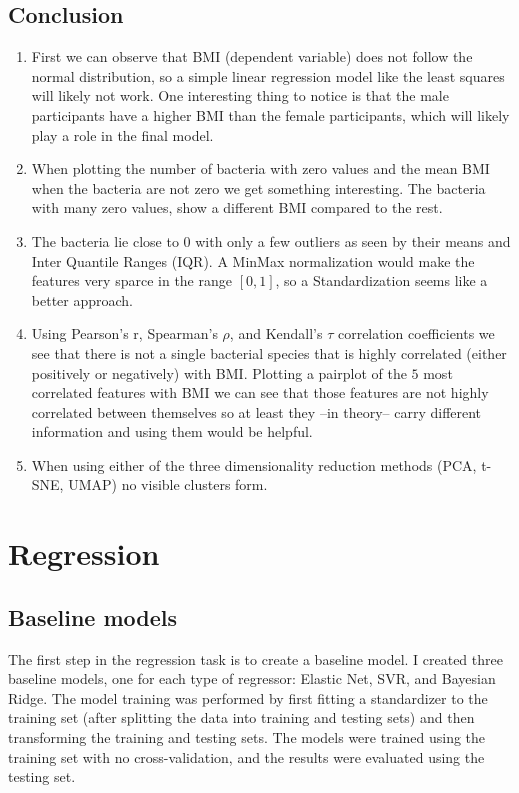 \documentclass[12pt]{article}
\begin{document}
\subsection{Conclusion}
\begin{enumerate}
    \item First we can observe that BMI (dependent variable) does not follow the
    normal distribution, so a simple linear regression model like the least squares
    will likely not work. One interesting thing to notice is that the male
    participants have a higher BMI than the female participants, which will likely
    play a role in the final model.
    \item When plotting the number of bacteria with zero values and the mean BMI
    when the bacteria are not zero we get something interesting. The bacteria with
    many zero values, show a different BMI compared to the rest.
    \item The bacteria lie close to $0$ with only a few outliers as seen by their
    means and Inter Quantile Ranges (IQR). A MinMax normalization would make the
    features very sparce in the range $[0, 1]$, so a Standardization seems like a
    better approach.
    \item Using Pearson's r, Spearman's $\rho$, and Kendall's $\tau$ correlation
    coefficients we see that there is not a single bacterial species that is highly
    correlated (either positively or negatively) with BMI. Plotting a pairplot of
    the $5$ most correlated features with BMI we can see that those features are
    not highly correlated between themselves so at least they --in theory-- carry
    different information and using them would be helpful.
    \item When using either of the three dimensionality reduction methods (PCA,
    t-SNE, UMAP) no visible clusters form.
\end{enumerate}


\section{Regression}
\subsection{Baseline models}

The first step in the regression task is to create a baseline model. I created three
baseline models, one for each type of regressor: Elastic Net, SVR, and Bayesian
Ridge. The model training was performed by first fitting a standardizer to the 
training set (after splitting the data into training and testing sets) and then
transforming the training and testing sets. The models were trained using the
training set with no cross-validation, and the results were evaluated using the
testing set.
\end{document}

